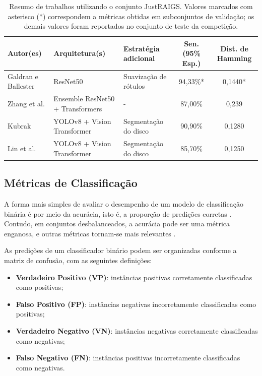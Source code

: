 \documentclass[12pt]{article}
\begin{document}
\begin{table}[h]
    \centering
    \scriptsize
    \renewcommand{\arraystretch}{1.5}
    \begin{tabularx}{\textwidth}{p{2.5cm}p{3cm}lcc}
    \toprule
    \textbf{Autor(es)} & \textbf{Arquitetura(s)} & \textbf{Estratégia adicional} & \textbf{Sen. (95\% Esp.)} & \textbf{Dist. de Hamming} \\
    \midrule
    Galdran e Ballester \cite{justraigs_galdran} & ResNet50 & Suavização de rótulos & 94,33\%* & 0,1440* \\

    Zhang et al. \cite{justraigs_zhang} & Ensemble ResNet50 + Transformers & - & 87,00\% & 0,239 \\

    Kubrak \cite{justraigs_kubrak} & YOLOv8 + Vision Transformer & Segmentação do disco & 90,90\% & 0,1280 \\

    Lin et al. \cite{justraigs_hu_lin} & YOLOv8 + Vision Transformer & Segmentação do disco & 85,70\% & 0,1250 \\
    \bottomrule
    \end{tabularx}
    \renewcommand{\arraystretch}{1}
    \caption{Resumo de trabalhos utilizando o conjunto JustRAIGS. Valores marcados com asterisco (*) correspondem a métricas obtidas em subconjuntos de validação; os demais valores foram reportados no conjunto de teste da competição.}
    \label{tab:justraigs_work}
\end{table}


\subsection{Métricas de Classificação}
\label{sec:metrics_classification}

A forma mais simples de avaliar o desempenho de um modelo de classificação binária é por meio da acurácia, isto é, a proporção de predições corretas \cite{bishop2006pattern}. Contudo, em conjuntos desbalanceados, a acurácia pode ser uma métrica enganosa, e outras métricas tornam-se mais relevantes \cite{goodfellow2016}.

As predições de um classificador binário podem ser organizadas conforme a matriz de confusão, com as seguintes definições:

\begin{itemize}[noitemsep]
    \item \textbf{Verdadeiro Positivo (VP)}: instâncias positivas corretamente classificadas como positivas;
    \item \textbf{Falso Positivo (FP)}: instâncias negativas incorretamente classificadas como positivas;
    \item \textbf{Verdadeiro Negativo (VN)}: instâncias negativas corretamente classificadas como negativas;
    \item \textbf{Falso Negativo (FN)}: instâncias positivas incorretamente classificadas como negativas.
\end{itemize}
\end{document}
